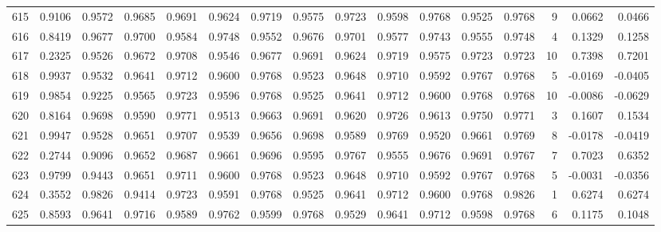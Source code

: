 \begin{tabular}{lrrrrrrrrrrrrrrr}
615 &      0.9106 &  0.9572 &  0.9685 &  0.9691 &  0.9624 &  0.9719 &  0.9575 &  0.9723 &  0.9598 &  0.9768 &   0.9525 &     0.9768 &      9 &                    0.0662 &                     0.0466 \\
616 &      0.8419 &  0.9677 &  0.9700 &  0.9584 &  0.9748 &  0.9552 &  0.9676 &  0.9701 &  0.9577 &  0.9743 &   0.9555 &     0.9748 &      4 &                    0.1329 &                     0.1258 \\
617 &      0.2325 &  0.9526 &  0.9672 &  0.9708 &  0.9546 &  0.9677 &  0.9691 &  0.9624 &  0.9719 &  0.9575 &   0.9723 &     0.9723 &     10 &                    0.7398 &                     0.7201 \\
618 &      0.9937 &  0.9532 &  0.9641 &  0.9712 &  0.9600 &  0.9768 &  0.9523 &  0.9648 &  0.9710 &  0.9592 &   0.9767 &     0.9768 &      5 &                   -0.0169 &                    -0.0405 \\
619 &      0.9854 &  0.9225 &  0.9565 &  0.9723 &  0.9596 &  0.9768 &  0.9525 &  0.9641 &  0.9712 &  0.9600 &   0.9768 &     0.9768 &     10 &                   -0.0086 &                    -0.0629 \\
620 &      0.8164 &  0.9698 &  0.9590 &  0.9771 &  0.9513 &  0.9663 &  0.9691 &  0.9620 &  0.9726 &  0.9613 &   0.9750 &     0.9771 &      3 &                    0.1607 &                     0.1534 \\
621 &      0.9947 &  0.9528 &  0.9651 &  0.9707 &  0.9539 &  0.9656 &  0.9698 &  0.9589 &  0.9769 &  0.9520 &   0.9661 &     0.9769 &      8 &                   -0.0178 &                    -0.0419 \\
622 &      0.2744 &  0.9096 &  0.9652 &  0.9687 &  0.9661 &  0.9696 &  0.9595 &  0.9767 &  0.9555 &  0.9676 &   0.9691 &     0.9767 &      7 &                    0.7023 &                     0.6352 \\
623 &      0.9799 &  0.9443 &  0.9651 &  0.9711 &  0.9600 &  0.9768 &  0.9523 &  0.9648 &  0.9710 &  0.9592 &   0.9767 &     0.9768 &      5 &                   -0.0031 &                    -0.0356 \\
624 &      0.3552 &  0.9826 &  0.9414 &  0.9723 &  0.9591 &  0.9768 &  0.9525 &  0.9641 &  0.9712 &  0.9600 &   0.9768 &     0.9826 &      1 &                    0.6274 &                     0.6274 \\
625 &      0.8593 &  0.9641 &  0.9716 &  0.9589 &  0.9762 &  0.9599 &  0.9768 &  0.9529 &  0.9641 &  0.9712 &   0.9598 &     0.9768 &      6 &                    0.1175 &                     0.1048 \\

\end{tabular}
